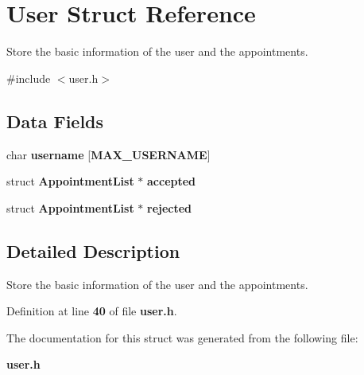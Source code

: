 \section{User Struct Reference}
\label{struct_user}


Store the basic information of the user and the appointments.  




{\ttfamily \#include $<$user.\+h$>$}

\subsection*{Data Fields}
\begin{DoxyCompactItemize}
\item 
char {\bfseries username} [{\bf M\+A\+X\+\_\+\+U\+S\+E\+R\+N\+A\+M\+E}]\label{struct_user_a63e4da517f59a6510a3b12d66f7e306e}

\item 
struct {\bf Appointment\+List} $\ast$ {\bfseries accepted}\label{struct_user_ae0ad1da30e04d195e45f919bc254b340}

\item 
struct {\bf Appointment\+List} $\ast$ {\bfseries rejected}\label{struct_user_a60d127ce8fdd7d91700bbf1f4278506f}

\end{DoxyCompactItemize}


\subsection{Detailed Description}
Store the basic information of the user and the appointments. 

Definition at line {\bf 40} of file {\bf user.\+h}.



The documentation for this struct was generated from the following file\+:\begin{DoxyCompactItemize}
\item 
{\bf user.\+h}\end{DoxyCompactItemize}
